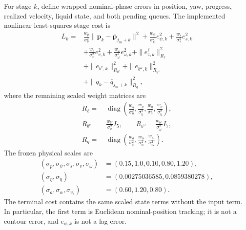 For stage $k$, define wrapped nominal-phase errors in position, yaw, progress,
realized velocity, liquid state, and both pending queues.  The implemented
nonlinear least-squares stage cost is
\begin{equation}
\begin{aligned}
  L_k={}&\frac{w_p}{\sigma_p^2}
  \|\bm p_k-\bar{\bm p}_{j_m+k}\|^2
  +\frac{w_\psi}{\sigma_\psi^2}e_{\psi,k}^2
  +\frac{w_s}{\sigma_s^2}e_{s,k}^2\\
  &+\frac{w_v}{\sigma_v^2}e_{v,k}^2
  +\frac{w_\omega}{\sigma_\omega^2}e_{\omega,k}^2
  +\|e_{z,k}^\ell\|_{R_\ell}^2\\
  &+\|e_{b^v,k}\|_{R_{b^v}}^2
  +\|e_{b^\omega,k}\|_{R_{b^\omega}}^2\\
  &+\|q_k-\bar q_{j_m+k}\|_{R_q}^2,
\end{aligned}
\label{eq:residual_stage_cost}
\end{equation}
where the remaining scaled weight matrices are
\begin{equation}
\begin{aligned}
R_\ell={}&\operatorname{diag}
\left(\frac{w_\eta}{\sigma_\eta^2},
\frac{w_{\dot\eta}}{\sigma_{\dot\eta}^2},
\frac{w_\eta}{\sigma_\eta^2},
\frac{w_{\dot\eta}}{\sigma_{\dot\eta}^2}\right),\\
R_{b^v}={}&\frac{w_{b^v}}{\sigma_v^2}I_5,\qquad
R_{b^\omega}=\frac{w_{b^\omega}}{\sigma_\omega^2}I_7,\\
R_q={}&\operatorname{diag}
\left(\frac{w_a}{\sigma_a^2},
\frac{w_\alpha}{\sigma_\alpha^2},
\frac{w_{v_s}}{\sigma_{v_s}^2}\right).
\end{aligned}
\label{eq:residual_cost_scaling}
\end{equation}
The frozen physical scales are
\begin{equation}
\begin{aligned}
(\sigma_p,\sigma_\psi,\sigma_s,\sigma_v,\sigma_\omega)
&=(0.15,1.0,0.10,0.80,1.20),\\
(\sigma_\eta,\sigma_{\dot\eta})
&=(0.00275036585,0.0859380278),\\
(\sigma_a,\sigma_\alpha,\sigma_{v_s})
&=(0.60,1.20,0.80).
\end{aligned}
\label{eq:residual_cost_scales}
\end{equation}
The terminal cost contains the same scaled state terms without the input term.
In particular, the first term
is Euclidean nominal-position tracking; it is not a contour error, and
$e_{\psi,k}$ is not a lag error.


